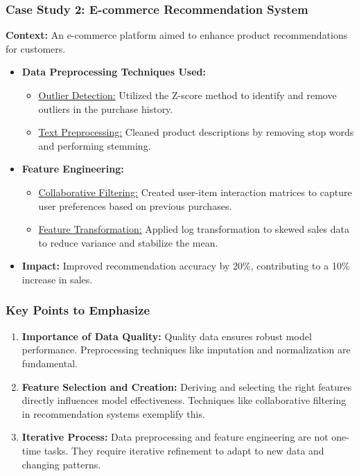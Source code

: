 \documentclass[aspectratio=169]{beamer}
\begin{document}
\begin{frame}
    \frametitle{Case Study 2: E-commerce Recommendation System}
    \textbf{Context:} An e-commerce platform aimed to enhance product recommendations for customers.

    \begin{itemize}
        \item \textbf{Data Preprocessing Techniques Used:}
        \begin{itemize}
            \item \underline{Outlier Detection:} Utilized the Z-score method to identify and remove outliers in the purchase history.
            \item \underline{Text Preprocessing:} Cleaned product descriptions by removing stop words and performing stemming.
        \end{itemize}

        \item \textbf{Feature Engineering:}
        \begin{itemize}
            \item \underline{Collaborative Filtering:} Created user-item interaction matrices to capture user preferences based on previous purchases.
            \item \underline{Feature Transformation:} Applied log transformation to skewed sales data to reduce variance and stabilize the mean.
        \end{itemize}

        \item \textbf{Impact:} Improved recommendation accuracy by 20\%, contributing to a 10\% increase in sales.
    \end{itemize}
\end{frame}

\begin{frame}[fragile]
    \frametitle{Key Points to Emphasize}
    \begin{enumerate}
        \item \textbf{Importance of Data Quality:} Quality data ensures robust model performance. Preprocessing techniques like imputation and normalization are fundamental.
        
        \item \textbf{Feature Selection and Creation:} Deriving and selecting the right features directly influences model effectiveness. Techniques like collaborative filtering in recommendation systems exemplify this.
        
        \item \textbf{Iterative Process:} Data preprocessing and feature engineering are not one-time tasks. They require iterative refinement to adapt to new data and changing patterns.
    \end{enumerate}
\end{frame}
\end{document}
